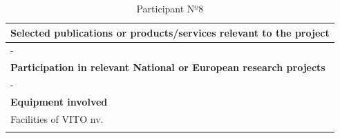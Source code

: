 \begin{longtable}[H]{|p{0.7cm}|p{4cm}|p{7cm}|p{1.3cm}|}
	\multicolumn{4}{|p{13cm}|}{\textbf{Selected publications or products/services relevant to the project}}  \\ \hline
	
	\multicolumn{4}{|p{14.5cm}|}{-}  \\ \hline
	
	\multicolumn{4}{|p{13cm}|}{\textbf{Participation in relevant National or European research projects}}  \\ \hline
	
	\multicolumn{4}{|p{14.5cm}|}{-}  \\ \hline
	
	\multicolumn{4}{|p{13cm}|}{\textbf{Equipment involved}}  \\ \hline
	
	\multicolumn{4}{|p{14.5cm}|}{Facilities of VITO nv.}  \\ \hline
	\caption{Participant Nº8}
\end{longtable}